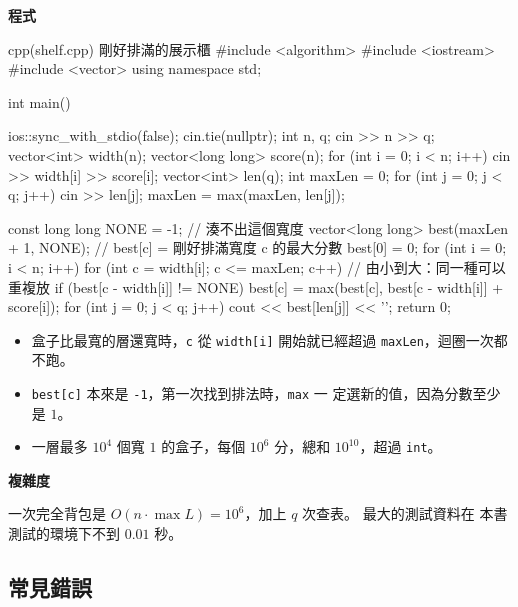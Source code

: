 \textbf{程式}

\begin{example}[label=ex:shelf]{cpp}{(shelf.cpp) 剛好排滿的展示櫃}
#include <algorithm>
#include <iostream>
#include <vector>
using namespace std;

int main() {
    ios::sync_with_stdio(false);
    cin.tie(nullptr);
    int n, q;
    cin >> n >> q;
    vector<int> width(n);
    vector<long long> score(n);
    for (int i = 0; i < n; i++) {
        cin >> width[i] >> score[i];
    }
    vector<int> len(q);
    int maxLen = 0;
    for (int j = 0; j < q; j++) {
        cin >> len[j];
        maxLen = max(maxLen, len[j]);
    }

    const long long NONE = -1;                // 湊不出這個寬度
    vector<long long> best(maxLen + 1, NONE); // best[c] = 剛好排滿寬度 c 的最大分數
    best[0] = 0;
    for (int i = 0; i < n; i++) {
        for (int c = width[i]; c <= maxLen; c++) {   // 由小到大：同一種可以重複放
            if (best[c - width[i]] != NONE) {
                best[c] = max(best[c], best[c - width[i]] + score[i]);
            }
        }
    }
    for (int j = 0; j < q; j++) {
        cout << best[len[j]] << '\n';
    }
    return 0;
}
\end{example}


\begin{itemize}
\item 盒子比最寬的層還寬時，\texttt{c} 從 \texttt{width[i]} 開始就已經超過
\texttt{maxLen}，迴圈一次都不跑。
\item \texttt{best[c]} 本來是 \texttt{-1}，第一次找到排法時，\texttt{max} 一
定選新的值，因為分數至少是 $1$。
\item 一層最多 $10^4$ 個寬 $1$ 的盒子，每個 $10^6$ 分，總和 $10^{10}$，超過
\texttt{int}。
\end{itemize}

\textbf{複雜度}

一次完全背包是 $O(n \cdot \max L) = 10^6$，加上 $q$ 次查表。 最大的測試資料在
本書測試的環境下不到 $0.01$ 秒。

\subsection{常見錯誤}

